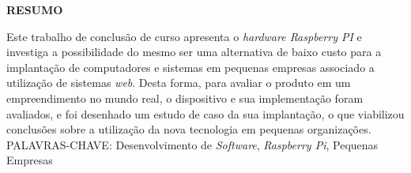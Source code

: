 \begin{center}
\textbf{RESUMO}
\end{center}
\singlespacing

\noindent Este trabalho de conclusão de curso apresenta o \textit{hardware Raspberry PI} e investiga a possibilidade do mesmo ser uma alternativa de baixo custo para a implantação de computadores e sistemas em pequenas empresas associado a utilização de sistemas \textit{web}. Desta forma, para avaliar o produto em um empreendimento no mundo real, o dispositivo e sua implementação foram avaliados, e foi desenhado um estudo de caso da sua implantação, o que viabilizou conclusões sobre a utilização da nova tecnologia em pequenas organizações.\\

\noindent PALAVRAS-CHAVE: Desenvolvimento de \textit{Software}, \textit{Raspberry Pi}, Pequenas Empresas
